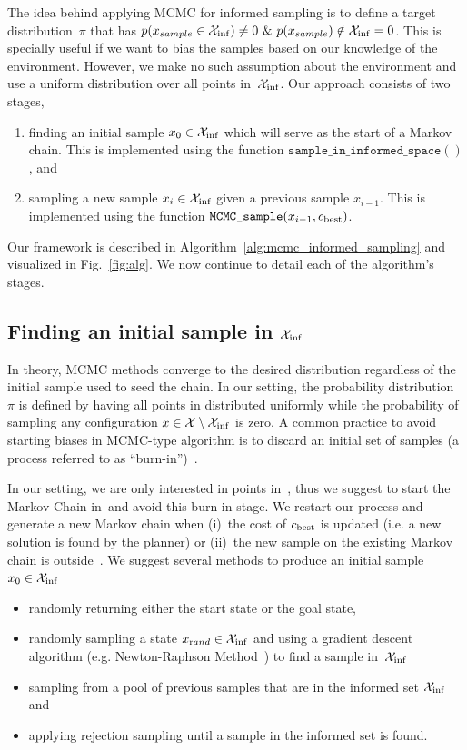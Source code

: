 \documentclass[letterpaper, 10 pt, conference]{ieeeconf}  %
\begin{document}
The idea behind applying MCMC for informed sampling is to define a target distribution~$ \pi $ that has $p(x_{sample}\in\mathcal{X}_{\rm {inf}}) \ne 0 ~\&~ p(x_{sample})\notin\mathcal{X}_{\rm {inf}} = 0$. 
This is specially useful if we want to bias the samples based on our knowledge of the environment.
However, we make no such assumption about the environment and use a uniform distribution over all points in~$ \mathcal{X}_{\rm {inf}} $. 
Our approach consists of two stages,
\begin{enumerate}
	\item finding an initial sample $ x_0 \in \mathcal{X}_{\rm {inf}} $ which will serve as the start of a Markov chain. 
	This is implemented using the function 
	$ \texttt{sample\_in\_informed\_space}( )$, and
	\item sampling a new sample $ x_i \in \mathcal{X}_{\rm {inf}} $ given a previous sample $ x_{i-1} $. 
	This is implemented using the function $\texttt{MCMC\_sample} (x_{i-1}, c_{\rm best})$.
\end{enumerate}
Our framework is described in Algorithm~\ref{alg:mcmc_informed_sampling} and visualized in Fig.~\ref{fig:alg}.
We now continue to detail each of the algorithm's stages.

\subsection{Finding an initial sample in $\mathcal{X}_{\rm {inf}}$}
In theory, MCMC methods converge to the desired distribution regardless of the initial sample used to seed the chain.
In our setting, the probability distribution~ $ \pi $ is defined by having all points in \Cinf distributed uniformly
while 
the probability of sampling any configuration $x \in \mathcal{X} \setminus \mathcal{X}_{\rm {inf}}$ is zero.
A common practice to avoid starting biases in MCMC-type algorithm is to discard an initial set of samples (a process referred to as ``burn-in'')~\cite{ADDJ03}. 

In our setting, we are only interested in points in~\Cinf, thus we suggest to start the Markov Chain in~\Cinf and avoid this burn-in stage. 
We restart our process and generate a new Markov chain  when 
(i)~the cost of $c_{\rm best}$ is updated (i.e. a new solution is found by the planner) or
(ii)~the new sample on the existing Markov chain is outside~\Cinf.
We suggest several methods to produce an initial sample~$x_0 \in \mathcal{X}_{\rm {inf}} $ 
\begin{itemize}
	\item randomly returning either the start state or the goal state,
	\item randomly sampling a state $x_{\text rand} \in \mathcal{X}_{\rm {inf}}$ and using a gradient descent algorithm (e.g. Newton-Raphson Method~\cite{RT06}) to find a sample in~$ \mathcal{X}_{\rm {inf}} $
	\item sampling from a pool of previous samples that are in the informed set $ \mathcal{X}_{\rm {inf}} $ and
	\item applying rejection sampling until a sample in the informed set is found.
\end{itemize}
\end{document}
